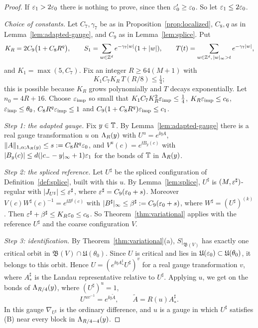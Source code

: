 \begin{proof}
If $\varepsilon_1>2\varepsilon_0$ there is nothing to prove, since then $\varepsilon'_0\ge\varepsilon_0$. So let $\varepsilon_1\le2\varepsilon_0$.

\emph{Choice of constants.} Let $C_7,\gamma_7$ be as in Proposition~\ref{prop:localized}, $C_8,q$ as in Lemma~\ref{lem:adapted-gauge}, and $C_9$ as in Lemma~\ref{lem:splice}. Put
\[
K_R=2C_9\big(1+C_8R^q\big),\qquad S_1=\sum_{w\in\mathbb Z^d}e^{-\gamma_7|w|}(1+|w|),\qquad T(t)=\sum_{w\in\mathbb Z^d,\,|w|_\infty>t}e^{-\gamma_7|w|},
\]
and $K_1=\max(5,C_7)$. Fix an integer $R\ge64(M+1)$ with
\[
K_1C_7K_R\,T(R/8)\le\tfrac14 ;
\]
this is possible because $K_R$ grows polynomially and $T$ decays exponentially. Let $n_0=4R+16$. Choose $\varepsilon_{\rm imp}$ so small that $K_1C_7K_R^2\varepsilon_{\rm imp}\le\frac14$, $K_R\varepsilon_{\rm imp}\le c_6$, $\varepsilon_{\rm imp}\le\theta_0$, $C_8R^q\varepsilon_{\rm imp}\le1$ and $C_9(1+C_8R^q)\varepsilon_{\rm imp}\le c_1$.

\emph{Step 1: the adapted gauge.} Fix $y\in\mathbb T$. By Lemma~\ref{lem:adapted-gauge} there is a real gauge transformation $u$ on $\Lambda_R(y)$ with $U^u=e^{\ii\eta A}$, $\|A\|_{1,\alpha;\Lambda_R(y)}\le s:=C_8R^q\varepsilon_0$, and $V^u(c)=e^{\ii B_y(c)}$ with $|B_y(c)|\le d(|c_--y|_\infty+1)\varepsilon_1$ for the bonds of $\mathbb T$ in $\Lambda_R(y)$.

\emph{Step 2: the spliced reference.} Let $U^\sharp$ be the spliced configuration of Definition~\ref{def:splice}, built with this $u$. By Lemma~\ref{lem:splice}, $U^\sharp$ is $(M,\varepsilon^\sharp)$-regular with $|J_{U^\sharp}|\le\varepsilon^\sharp$, where $\varepsilon^\sharp=C_9(\varepsilon_0+s)$. Moreover $V(c)W^\sharp(c)^{-1}=e^{\ii B^\sharp(c)}$ with $|B^\sharp|_\infty\le\beta^\sharp:=C_9(\varepsilon_0+s)$, where $W^\sharp=(U^\sharp)^{(k)}$. Then $\varepsilon^\sharp+\beta^\sharp\le K_R\varepsilon_0\le c_6$. So Theorem~\ref{thm:variational} applies with the reference $U^\sharp$ and the coarse configuration $V$.

\emph{Step 3: identification.} By Theorem~\ref{thm:variational}(a), $S|_{\mathfrak B(V)}$ has exactly one critical orbit in $\mathfrak B(V)\cap\mathfrak U(\theta_0)$. Since $U$ is critical and lies in $\mathfrak U(\varepsilon_0)\subset\mathfrak U(\theta_0)$, it belongs to this orbit. Hence $U=(e^{\ii\eta A^\sharp_*}U^\sharp)^v$ for a real gauge transformation $v$, where $A^\sharp_*$ is the Landau representative relative to $U^\sharp$. Applying $u$, we get on the bonds of $\Lambda_{R/4}(y)$, where $(U^\sharp)^u=1$,
\[
U^{uv^{-1}}=e^{\ii\eta\tilde A},\qquad\tilde A=R(u)A^\sharp_* .
\]
In this gauge $\nabla_{U^\sharp}$ is the ordinary difference, and $u$ is a gauge in which $U^\sharp$ satisfies (B) near every block in $\Lambda_{R/4-4}(y)$.


\end{proof}
